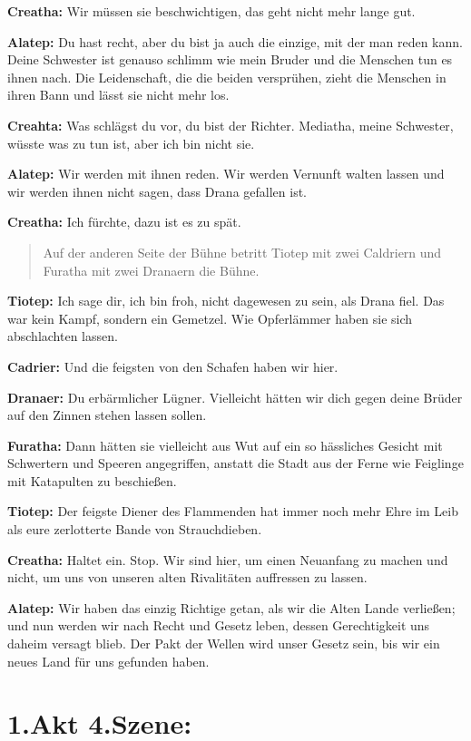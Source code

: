 \documentclass[a5paper,6pt]{book}
\begin{document}
\textbf{Creatha:} Wir müssen sie beschwichtigen, das geht nicht mehr lange gut.

\textbf{Alatep:} Du hast recht, aber du bist ja auch die einzige, mit der man reden kann. Deine
Schwester ist genauso schlimm wie mein Bruder und die Menschen tun es ihnen nach.
Die Leidenschaft, die die beiden versprühen, zieht die Menschen in ihren Bann und
lässt sie nicht mehr los.

\textbf{Creahta:} Was schlägst du vor, du bist der Richter. Mediatha, meine Schwester, wüsste was zu
tun ist, aber ich bin nicht sie.

\textbf{Alatep:} Wir werden mit ihnen reden. Wir werden Vernunft walten lassen und wir werden
ihnen nicht sagen, dass Drana gefallen ist.

\textbf{Creatha:} Ich fürchte, dazu ist es zu spät.

\begin{quote}
Auf der anderen Seite der Bühne betritt Tiotep mit zwei Caldriern und Furatha mit zwei
Dranaern die Bühne.
\end{quote}

\textbf{Tiotep:} Ich sage dir, ich bin froh, nicht dagewesen zu sein, als Drana fiel. Das war kein
Kampf, sondern ein Gemetzel. Wie Opferlämmer haben sie sich abschlachten lassen.

\textbf{Cadrier:} Und die feigsten von den Schafen haben wir hier.

\textbf{Dranaer:} Du erbärmlicher Lügner. Vielleicht hätten wir dich gegen deine Brüder auf den
Zinnen stehen lassen sollen.

\textbf{Furatha:} Dann hätten sie vielleicht aus Wut auf ein so hässliches Gesicht mit Schwertern und
Speeren angegriffen, anstatt die Stadt aus der Ferne wie Feiglinge mit Katapulten zu
beschießen.

\textbf{Tiotep:} Der feigste Diener des Flammenden hat immer noch mehr Ehre im Leib als eure
zerlotterte Bande von Strauchdieben.

\textbf{Creatha:} Haltet ein. Stop. Wir sind hier, um einen Neuanfang zu machen und nicht, um uns
von unseren alten Rivalitäten auffressen zu lassen.

\textbf{Alatep:} Wir haben das einzig Richtige getan, als wir die Alten Lande verließen; und nun
werden wir nach Recht und Gesetz leben, dessen Gerechtigkeit uns daheim versagt
blieb. Der Pakt der Wellen wird unser Gesetz sein, bis wir ein neues Land für uns
gefunden haben.

\section{1.Akt 4.Szene:}
\end{document}
